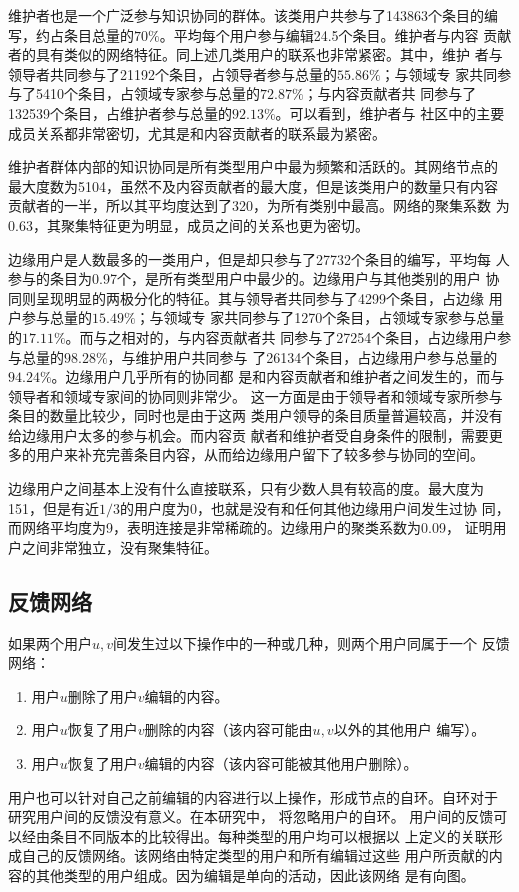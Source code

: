 维护者也是一个广泛参与知识协同的群体。该类用户共参与了143863个条目的编
写，约占条目总量的$70\%$。平均每个用户参与编辑24.5个条目。维护者与内容
贡献者的具有类似的网络特征。同上述几类用户的联系也非常紧密。其中，维护
者与领导者共同参与了21192个条目，占领导者参与总量的$55.86\%$；与领域专
家共同参与了5410个条目，占领域专家参与总量的$72.87\%$；与内容贡献者共
同参与了132539个条目，占维护者参与总量的$92.13\%$。可以看到，维护者与
社区中的主要成员关系都非常密切，尤其是和内容贡献者的联系最为紧密。

维护者群体内部的知识协同是所有类型用户中最为频繁和活跃的。其网络节点的
最大度数为5104，虽然不及内容贡献者的最大度，但是该类用户的数量只有内容
贡献者的一半，所以其平均度达到了320，为所有类别中最高。网络的聚集系数
为0.63，其聚集特征更为明显，成员之间的关系也更为密切。

边缘用户是人数最多的一类用户，但是却只参与了27732个条目的编写，平均每
人参与的条目为0.97个，是所有类型用户中最少的。边缘用户与其他类别的用户
协同则呈现明显的两极分化的特征。其与领导者共同参与了4299个条目，占边缘
用户参与总量的$15.49\%$；与领域专
家共同参与了1270个条目，占领域专家参与总量的$17.11\%$。而与之相对的，与内容贡献者共
同参与了27254个条目，占边缘用户参与总量的$98.28\%$，与维护用户共同参与
了26134个条目，占边缘用户参与总量的$94.24\%$。边缘用户几乎所有的协同都
是和内容贡献者和维护者之间发生的，而与领导者和领域专家间的协同则非常少。
这一方面是由于领导者和领域专家所参与条目的数量比较少，同时也是由于这两
类用户领导的条目质量普遍较高，并没有给边缘用户太多的参与机会。而内容贡
献者和维护者受自身条件的限制，需要更多的用户来补充完善条目内容，从而给边缘用户留下了较多参与协同的空间。

边缘用户之间基本上没有什么直接联系，只有少数人具有较高的度。最大度为
151，但是有近$1/3$的用户度为0，也就是没有和任何其他边缘用户间发生过协
同，而网络平均度为9，表明连接是非常稀疏的。边缘用户的聚类系数为0.09，
证明用户之间非常独立，没有聚集特征。

\subsection{反馈网络}
如果两个用户$u,v$间发生过以下操作中的一种或几种，则两个用户同属于一个
反馈网络：
\begin{enumerate}
\item 用户$u$删除了用户$v$编辑的内容。
\item 用户$u$恢复了用户$v$删除的内容（该内容可能由$u,v$以外的其他用户
  编写）。
\item 用户$u$恢复了用户$v$编辑的内容（该内容可能被其他用户删除）。
\end{enumerate}
用户也可以针对自己之前编辑的内容进行以上操作，形成节点的自环。自环对于
研究用户间的反馈没有意义。在本研究中，
将忽略用户的自环。
用户间的反馈可以经由条目不同版本的比较得出。每种类型的用户均可以根据以
上定义的关联形成自己的反馈网络。该网络由特定类型的用户和所有编辑过这些
用户所贡献的内容的其他类型的用户组成。因为编辑是单向的活动，因此该网络
是有向图。

